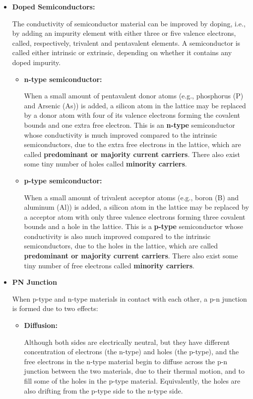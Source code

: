 \begin{itemize}
\item {\bf Doped Semiconductors:}

The conductivity of semiconductor material can be improved by doping, i.e.,
by adding an impurity element with either three or five valence electrons,
called, respectively, trivalent and pentavalent elements. A semiconductor
is called either intrinsic or extrinsic, depending on whether it contains
any doped impurity.

\begin{itemize}
\item {\bf n-type semiconductor:}

When a small amount of pentavalent donor atoms (e.g., phosphorus (P) and
Arsenic (As)) is added, a silicon atom in the lattice may be replaced by
a donor atom with four of its valence electrons forming the covalent bounds 
and one extra free electron. This is an {\bf n-type} semiconductor whose 
conductivity is much improved compared to the intrinsic semiconductors, due 
to the extra free electrons in the lattice, which are called {\bf predominant
or majority current carriers}. There also exist some tiny number of holes 
called {\bf minority carriers}.

\item {\bf p-type semiconductor:}

When a small amount of trivalent acceptor atoms (e.g., boron (B) and aluminum
(Al)) is added, a silicon atom in the lattice may be replaced by a acceptor
atom with only three valence electrons forming three covalent bounds and a 
hole in the lattice. This is a {\bf p-type} semiconductor whose conductivity 
is also much improved compared to the intrinsic semiconductors, due to the 
holes in the lattice, which are called {\bf predominant or majority current 
carriers}. There also exist some tiny number of free electrons called 
{\bf minority carriers}.
\end{itemize}


\item {\bf PN Junction}


When p-type and n-type materials in contact with each other, a p-n junction is
formed due to two effects:
\begin{itemize}
\item {\bf Diffusion:}

Although both sides are electrically neutral, but they have different
concentration of electrons (the n-type) and holes (the p-type), and the 
free electrons in the n-type material begin to diffuse across the p-n junction
between the two materials, due to their thermal motion, and to fill some of the
holes in the p-type material. Equivalently, the holes are also drifting from
the p-type side to the n-type side.


\end{itemize}
\end{itemize}
